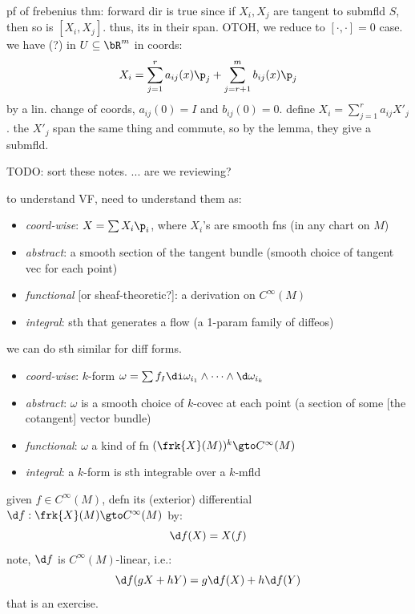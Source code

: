 pf of frebenius thm: forward dir is true since if $X_{i},X_{j}$ are
tangent to submfld $S$, then so is $[X_{i},X_{j}]$.
thus, its in their span.
OTOH, we reduce to $[\cdot,\cdot]=0$ case.
we have (?) in $U\subseteq\bR^{m}$ in coords:
\begin{equation*}
	X_{i}=\sum_{j=1}^{r}a_{ij}(x)\p_{j}+\sum_{j=r+1}^{m}b_{ij}(x)\p_{j}
\end{equation*}
by a lin. change of coords, $a_{ij}(0)=I$ and $b_{ij}(0)=0$.
define $X_{i}=\sum_{j=1}^{r}a_{ij}X'_{j}$.
the $X'_{j}$ span the same thing and commute, so by the lemma,
they give a submfld.

TODO: sort these notes.
... are we reviewing?

to understand VF, need to understand them as:
\begin{itemize}
	\item \textit{coord-wise}: $X=\sum X_{i}\p_{i}$, where $X_{i}$'s are smooth fns
		(in any chart on $M$)
	\item \textit{abstract}: a smooth section of the tangent bundle
		(smooth choice of tangent vec for each point)
	\item \textit{functional} [or sheaf-theoretic?]: a derivation on $C^{\infty}(M)$
	\item \textit{integral}: sth that generates a flow
		(a 1-param family of diffeos)
\end{itemize}

we can do sth similar for diff forms.
\begin{itemize}
	\item \textit{coord-wise}: $k$-form $\omega=\sum f_{I}\di\omega_{i_{1}}\wedge \cdots \wedge \d\omega_{i_{k}}$
	\item \textit{abstract}: $\omega$ is a smooth choice of $k$-covec at each point
		(a section of some [the cotangent] vector bundle)
	\item \textit{functional}: $\omega$ a kind of fn $(\frk{X}(M))^{k}\gto C^{\infty}(M)$
	\item \textit{integral}: a $k$-form is sth integrable over a $k$-mfld
\end{itemize}

\begin{xmp}
	given $f\in C^{\infty}(M)$, defn its (exterior) differential
	$\d f:\frk{X}(M)\gto C^{\infty}(M)$ by:
	\begin{equation*}
		\d f(X) = X(f)
	\end{equation*}
	note, $\d f$ is $C^{\infty}(M)$-linear, i.e.:
	\begin{equation*}
		\d f(gX+hY)=g \d f(X)+h\d f(Y)
	\end{equation*}
	that is an exercise.
\end{xmp} \

